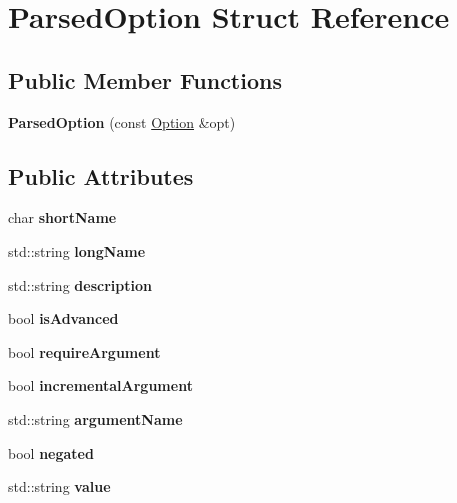 \hypertarget{structParsedOption}{}\section{Parsed\+Option Struct Reference}
\label{structParsedOption}
\subsection*{Public Member Functions}
\begin{DoxyCompactItemize}
\item 
\mbox{\label{structParsedOption_a3e1b558313151904a0a0302aac487af3}} 
{\bfseries Parsed\+Option} (const \mbox{\hyperlink{structOption}{Option}} \&opt)
\end{DoxyCompactItemize}
\subsection*{Public Attributes}
\begin{DoxyCompactItemize}
\item 
\mbox{\label{structParsedOption_ac8cbb9ba68fe6c0bbaf8eab02b4ceaa0}} 
char {\bfseries short\+Name}
\item 
\mbox{\label{structParsedOption_a4a90402042128eed7fd8aed287931059}} 
std\+::string {\bfseries long\+Name}
\item 
\mbox{\label{structParsedOption_a96b96cbb5b4da157a14c39cf4d4057fd}} 
std\+::string {\bfseries description}
\item 
\mbox{\label{structParsedOption_a12f32936ed87f81da98b3267ebbb9d4d}} 
bool {\bfseries is\+Advanced}
\item 
\mbox{\label{structParsedOption_a026856b4cef6e7d0d4e55ba6e66df1da}} 
bool {\bfseries require\+Argument}
\item 
\mbox{\label{structParsedOption_ab72d2d25455ec7f7ce247454d5ea23dc}} 
bool {\bfseries incremental\+Argument}
\item 
\mbox{\label{structParsedOption_a70593ad407ef4d91cd10e6a4c6e4d793}} 
std\+::string {\bfseries argument\+Name}
\item 
\mbox{\label{structParsedOption_afc53c0c192fd27d17588433a9eab1a14}} 
bool {\bfseries negated}
\item 
\mbox{\label{structParsedOption_a1e464616f11ed1b38dae9208bbef1c48}} 
std\+::string {\bfseries value}
\end{DoxyCompactItemize}

